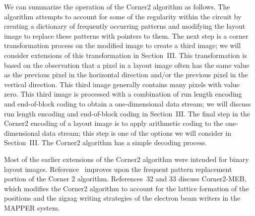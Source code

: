 \documentclass{article}
\begin{document}
We can summarize the operation of the Corner2 algorithm as follows.
The algorithm attempts to account for some of the regularity within the circuit
by creating a dictionary of frequently occurring patterns and modifying the
layout image to replace these patterns with pointers to them.
The next step is a corner transformation process on the modified image
to create a third image;  we will consider extensions of this transformation
in Section~III.  This transformation is based on the observation that a
pixel in a layout image often has the same value as the previous pixel in
the horizontal direction and/or the previous pixel in the vertical direction.
This third image generally contains many pixels with value
zero.  This third image is processed with a combination of run length 
encoding and end-of-block coding to obtain a one-dimensional data
stream; we will discuss run length encoding and end-of-block coding in
Section~III.  The final step in the Corner2 encoding of a layout image is to
apply arithmetic coding to the one-dimensional data stream;
this step is one of the options we will consider in Section~III.
The Corner2 algorithm has a simple decoding process.  

Most of the earlier extensions of the Corner2 algorithm were intended
for binary layout images.  Reference~ improves upon the frequent pattern 
replacement portion of the Corner 2 algorithm.
References~32 and 33 discuss Corner2-MEB, which modifies the Corner2 
algorithm to account for the lattice
formation of the positions and the zigzag writing strategies of the electron
beam writers in the MAPPER system.
\end{document}
